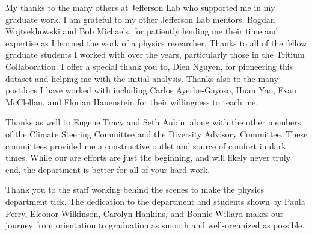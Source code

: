 \documentclass[../main.tex]{subfiles}
\begin{document}
\begin{singlespace}
{{\begin{flushleft}
My thanks to the many others at Jefferson Lab who supported me in my graduate work. I am grateful to my other Jefferson Lab mentors, Bogdan Wojtsekhowski and Bob Michaels, for patiently lending me their time and expertise as I learned the work of a physics researcher. Thanks to all of the fellow graduate students I worked with over the years, particularly those in the Tritium Collaboration. I offer a special thank you to, Dien Nguyen, for pioneering this dataset and helping me with the initial analysis. Thanks also to the many postdocs I have worked with including Carlos Ayerbe-Gayoso, Huan Yao, Evan McClellan, and Florian Hauenstein for their willingness to teach me.

\end{flushleft}
} %

{\parindent0pt %
\begin{flushleft}
                                                                                 
Thanks as well to Eugene Tracy and Seth Aubin, along with the other members of the Climate Steering Committee and the Diversity Advisory Committee. These committees provided me a constructive outlet and source of comfort in dark times. While our are efforts are just the beginning, and will likely never truly end, the department is better for all of your hard work.

\end{flushleft}
} %

{\parindent0pt %
\begin{flushleft}
                                                                                 
Thank you to the staff working behind the scenes to make the physics department tick. The dedication to the department and students shown by Paula Perry, Eleonor Wilkinson, Carolyn Hankins, and Bonnie Willard makes our journey from orientation to graduation as smooth and well-organized as possible. 

\end{flushleft}
} %

{\parindent0pt %
\begin{flushleft}
                                                                                 

\end{flushleft}}}
\end{singlespace}
\end{document}
